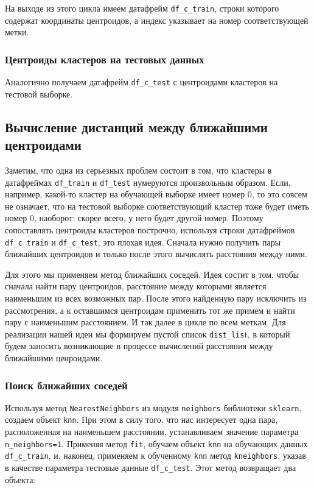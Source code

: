 \documentclass[a4paper,12pt]{article}
\begin{document}
На выходе из этого цикла имеем датафрейм \texttt{df\_c\_train}, строки которого содержат координаты центроидов, а индекс указывает на номер соответствующей метки.

\subsubsection{Центроиды кластеров на тестовых данных}

Аналогично получаем датафрейм \texttt{df\_c\_test} с центроидами кластеров на тестовой выборке.


\subsection{Вычисление дистанций между ближайшими центроидами}

Заметим, что одна из серьезных проблем состоит в том, что кластеры в датафреймах \texttt{df\_train} и \texttt{df\_test} нумеруются произвольным образом. Если, например, какой-то кластер на обучающей выборке имеет номер 0, то это совсем не означает, что на тестовой выборке соответствующий кластер тоже будет иметь номер 0, наоборот: скорее всего, у него будет другой номер. Поэтому сопоставлять центроиды кластеров построчно, используя строки датафреймов \texttt{df\_c\_train} и \texttt{df\_c\_test}, это плохая идея. Сначала нужно получить пары ближайших центроидов и только после этого вычислять расстояния между ними.

Для этого мы применяем метод ближайших соседей. Идея состит в том, чтобы сначала найти пару центроидов, расстояние между которыми является наименьшим из всех возможных пар. После этого найденную пару исключить из рассмотрения, а к оставшимся центроидам применить тот же примем и найти пару с наименьшим расстоянием. И так далее в цикле по всем меткам. Для реализации нашей идеи мы формируем пустой список \texttt{dist\_lis}t, в который будем заносить возникающие в процессе вычислений расстояния между ближайшими ценроидами.

\subsubsection{Поиск ближайших соседей}

Используя метод \texttt{NearestNeighbors} из модуля \texttt{neighbors} библиотеки \texttt{sklearn}, создаем объект \texttt{knn}. При этом в силу того, что нас интересует одна пара, расположенная на наименьшем расстоянии, устанавливаем значение параметра \texttt{n\_neighbors=1}. Применяя метод \texttt{fit}, обучаем объект \texttt{knn} на обучающих данных \texttt{df\_c\_train}, и, наконец, применяем к обученному \texttt{knn} метод \texttt{kneighbors}, указав в качестве параметра тестовые данные \texttt{df\_c\_test}. Этот метод возвращает два объекта: 
\end{document}
